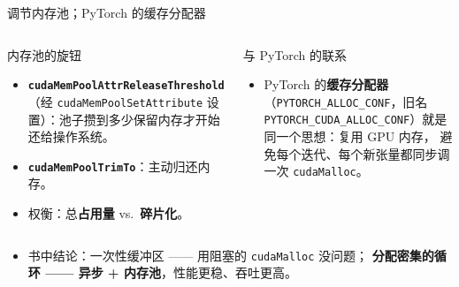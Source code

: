 \documentclass[aspectratio=169]{beamer}
\newcommand{\kw}[1]{\textbf{\textcolor{kwblue}{#1}}}
\begin{document}
\begin{frame}{调节内存池；PyTorch 的缓存分配器}
  \begin{columns}[t]
    \begin{block}{内存池的旋钮}
      \begin{itemize}\small
        \item \kw{\texttt{cudaMemPoolAttrReleaseThreshold}}（经
              \texttt{cudaMemPoolSetAttribute} 设置）：池子攒到多少保留内存才开始
              还给操作系统。
        \item \kw{\texttt{cudaMemPoolTrimTo}}：主动归还内存。
        \item 权衡：总\kw{占用量} vs.\ \kw{碎片化}。
      \end{itemize}
    \end{block}
    \begin{block}{与 PyTorch 的联系}
      \begin{itemize}\small
        \item PyTorch 的\kw{缓存分配器}（\texttt{PYTORCH\_ALLOC\_CONF}，旧名
              \texttt{PYTORCH\_CUDA\_ALLOC\_CONF}）就是同一个思想：复用 GPU 内存，
              避免每个迭代、每个新张量都同步调一次 \texttt{cudaMalloc}。
      \end{itemize}
    \end{block}
  \end{columns}
  \medskip
  \begin{itemize}
    \item 书中结论：一次性缓冲区 —— 用阻塞的 \texttt{cudaMalloc} 没问题；
          \kw{分配密集的循环 —— 异步 + 内存池}，性能更稳、吞吐更高。
  \end{itemize}
\end{frame}
\end{document}
